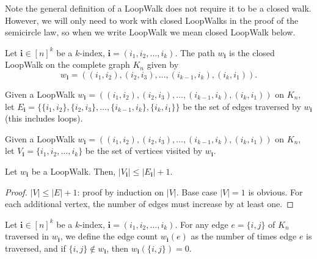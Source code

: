 Note the general definition of a LoopWalk does not require it to be a closed walk. However, we will
only need to work with closed LoopWalks in the proof of the semicircle law, so when we write
LoopWalk we mean closed LoopWalk below.


\begin{definition}
  \label{def:graph_walk_multi_index}
  Let $\mathbf{i} \in[n]^k$ be a $k$-index, $\mathbf{i}=\left(i_1, i_2, \ldots, i_k\right)$. The path
  $w_{\mathbf{i}}$ is the closed LoopWalk on the complete graph $K_n$ given by
  $$
  w_\mathbf{i}=((i_1, i_2),(i_2, i_3), \ldots,(i_{k-1}, i_k),(i_k, i_1)).
  $$
\end{definition}


\begin{definition}
  \label{def:graph_walk_edges}
  \leanok
  Given a LoopWalk $w_\mathbf{i}=((i_1, i_2),(i_2, i_3), \ldots,(i_{k-1}, i_k),(i_k, i_1))$ on
  $K_n$, let
  $E_\mathbf{i}= \{\{i_1, i_2\},\{i_2, i_3\}, \ldots,\{i_{k-1}, i_k\}, \{i_k, i_1\}\}$ be the set
  of edges traversed by $w_{\mathbf{i}}$ (this includes loops).
\end{definition}


\begin{definition}
  \label{def:graph_walk_vertices}
  \leanok
  Given a LoopWalk $w_\mathbf{i}=((i_1, i_2),(i_2, i_3), \ldots,(i_{k-1}, i_k),(i_k, i_1))$ on
  $K_n$, let $V_\mathbf{i}= \{i_1, i_2, \dots, i_k\}$ be the set
  of vertices visited by $w_{\mathbf{i}}$.
\end{definition}



\begin{proposition}%
  \label{prop:vertex_edge_inequality}
  Let $w_{\mathbf{i}}$ be a LoopWalk. Then,
  $|V_{\mathbf{i}}|\le |E_{\mathbf{i}}|+1$.
\end{proposition}

\begin{proof}
  $|V|\le |E|+1$: proof by induction on $|V|$. Base case $|V| = 1$ is obvious.
  For each additional vertex, the number of edges must increase by at least one.
\end{proof}


\begin{definition}
  \label{def:graph_edge_count}
  \leanok
  Let $\mathbf{i} \in[n]^k$ be a $k$-index, $\mathbf{i}=\left(i_1, i_2, \ldots, i_k\right)$.
  For any edge $e=\{i,j\}$ of $K_n$ traversed in $w_{\mathbf{i}}$, we define the edge count
  $w_{\mathbf{i}}(e)$ as the number of times edge $e$ is traversed, and if
  $\{i, j\} \notin w_{\mathbf{i}}$, then $w_{\mathbf{i}}(\{i, j\}) = 0$.
\end{definition}


